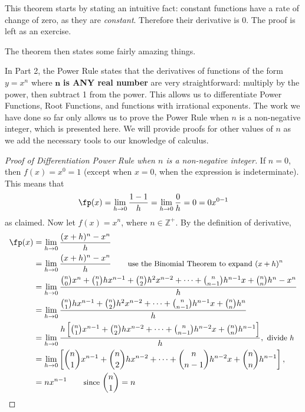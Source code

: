 This theorem starts by stating an intuitive fact: constant functions have a rate of change of zero, as they are \emph{constant}. Therefore their derivative is 0. The proof is left as an exercise.

The theorem then states some fairly amazing things.

In Part 2, the Power Rule states that the derivatives of functions of the form $y=x^n$ where $\mathbf{n}$ \textbf{is ANY real number} are very straightforward: multiply by the power, then subtract 1 from the power. This allows us to differentiate Power Functions, Root Functions, and functions with irrational exponents. The work we have done so far only allows us to prove the Power Rule when $n$ is a non-negative integer, which is presented here. We will provide proofs for other values of $n$ as we add the necessary tools to our knowledge of calculus.

\begin{proof}[Proof of Differentiation Power Rule when $n$ is a non-negative integer]
If $n=0$, then $f(x)=x^0=1$ (except when $x=0$, when the expression is indeterminate).  This means that
\[\fp(x)=\lim_{h\to0}\frac{1-1}h=\lim_{h\to0}\frac0h=0=0x^{0-1}\]
as claimed.  Now let $f(x)= x^n$, where $n \in \mathbb{Z}^+$. By the definition of derivative,
\begin{align*}
\fp(x)
&= \lim_{h\to 0} \dfrac{(x+h)^n - x^n}{h} \\
&= \lim_{h\to 0} \dfrac{(x+h)^n - x^n}{h} \qquad\text{\small use the Binomial Theorem to expand $(x+h)^n$} \\
&=\lim_{h\to 0} \dfrac{\binom{n}{0}x^n + \binom{n}{1} hx^{n-1} + \binom{n}{2} h^2x^{n-2}+ \dotsb +\binom{n}{n-1} h^{n-1}x + \binom {n}{n} h^n  -x^n}{h} \\
&= \lim_{h\to 0} \dfrac{\binom{n}{1} hx^{n-1} + \binom{n}{2} h^2x^{n-2}+ \dotsb +\binom{n}{n-1} h^{n-1}x + \binom{n}{n} h^n}{h} \\
&= \lim_{h\to 0} \dfrac{h\left[\binom{n}{1} x^{n-1} + \binom{n}{2} h x^{n-2}+ \dotsb +\binom{n}{n-1} h^{n-2}x + \binom {n}{n} h^{n-1}\right]}{h},\text{\small~divide $h$}\\
&= \lim_{h\to 0}\left[\dbinom{n}{1} x^{n-1} + \dbinom{n}{2} h x^{n-2}+ \dotsb +\dbinom{n}{n-1} h^{n-2}x + \dbinom {n}{n} h^{n-1}\right],\\
&=  n x^{n-1} \qquad\text{\small since } \dbinom{n}{1} = n \qedhere
\end{align*}%
\end{proof}

